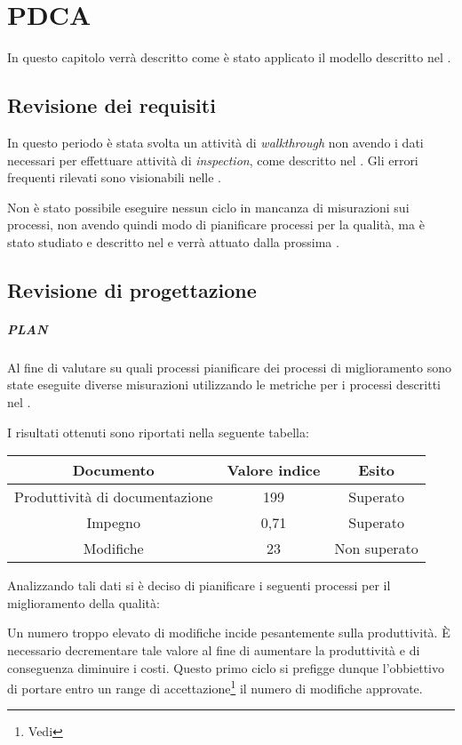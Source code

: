 \section{PDCA}
In questo capitolo verrà descritto come è stato applicato il modello  descritto nel \PianoDiQualifica.

\subsection{Revisione dei requisiti}

In questo periodo è stata svolta un attività di \emph{walkthrough} non avendo i dati necessari per effettuare attività di \emph{inspection}, come descritto nel \PianoDiQualifica. Gli errori frequenti rilevati sono visionabili nelle \NormeDiProgetto.

Non è stato possibile eseguire nessun ciclo  in mancanza di misurazioni sui processi, non avendo quindi modo di pianificare processi per la qualità, ma è stato studiato e descritto nel \PianoDiQualifica e verrà attuato dalla prossima .

\subsection{Revisione di progettazione}

\subparagraph{PLAN}

Al fine di valutare su quali processi pianificare dei processi di miglioramento sono state eseguite diverse misurazioni utilizzando le metriche per i processi descritti nel \PianoDiQualifica.

I risultati ottenuti sono riportati nella seguente tabella:

\begin{tabular}{ | c | c | c | }
\hline
Documento & Valore indice & Esito \\
\hline
Produttività di documentazione & 199 & Superato \\
\hline
Impegno & 0,71 & Superato \\
\hline
Modifiche & 23 & Non superato \\
\hline
\end{tabular}

Analizzando tali dati si è deciso di pianificare i seguenti processi per il miglioramento della qualità:

Un numero troppo elevato di modifiche incide pesantemente sulla produttività. È necessario decrementare tale valore al fine di aumentare la produttività e di conseguenza diminuire i costi. Questo primo ciclo  si prefigge dunque l'obbiettivo di portare entro un range di accettazione\footnote{Vedi \PianoDiQualifica} il numero di modifiche approvate.

